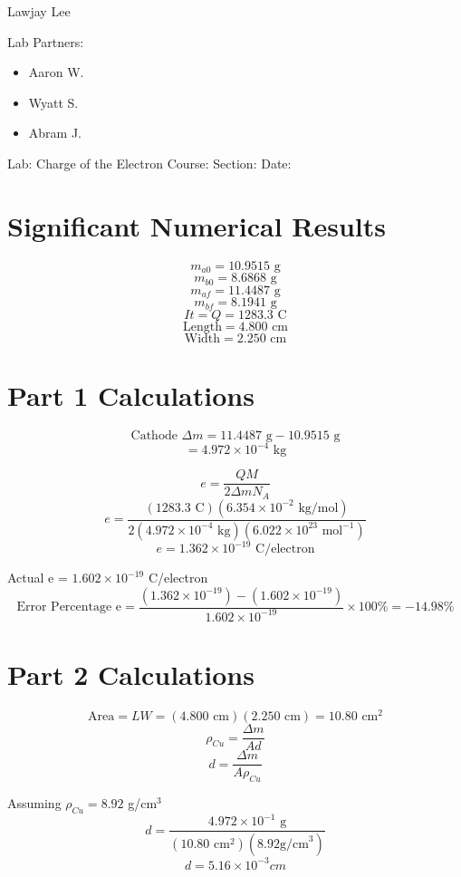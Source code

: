 \documentclass[fleqn]{article}
\begin{document}
\setlength{\mathindent}{0pt}
Lawjay Lee

Lab Partners:
\begin{itemize}
    \item Aaron W.
    \item Wyatt S.
    \item Abram J.
\end{itemize}
Lab: Charge of the Electron
Course:
Section:
Date:

\section*{Significant Numerical Results}
\[ m_{a0}=10.9515 \text{ g} \]
\[ m _{b0}=8.6868 \text{ g}  \]
\[ m _{af} =11.4487 \text{ g}  \]
\[m _{bf} = 8.1941 \text{ g}\]
\[ It = Q= 1283.3 \text{ C} \]
\[ \text{Length}=4.800 \text{ cm}\]
\[\text{Width} = 2.250 \text{ cm}\]

\section*{Part 1 Calculations}
\[ \text{Cathode } \Delta m = 11.4487 \text{ g} - 10.9515 \text{ g} \]
\[= 4.972 \times 10^{-4} \text{ kg} \]

\[ e = \frac{QM}{2 \Delta m N_A} \]
\[ e = \frac{(1283.3 \text{ C})(6.354 \times 10^{-2} \text{ kg/mol})}{2(4.972 \times 10^{-4} \text{ kg})
(6.022 \times 10^{23} \text{ mol}^{-1})
}\]
\[ e= 1.362 \times 10^{-19} \text{ C/electron}\]

Actual e = $1.602 \times 10^{-19}$ C/electron
\[ \text{Error Percentage e}=\frac{(1.362 \times 10^{-19}) - (1.602 \times 10^{-19})}{1.602 \times 10^{-19}} \times 100 \% = -14.98\%\]

\section*{Part 2 Calculations}
\[ \text{Area}=LW=(4.800 \text{ cm})(2.250 \text{ cm})=10.80 \text{ cm}^2 \]
\[ \rho _{Cu} = \frac{\Delta m}{Ad} \]
\[ d = \frac{\Delta m}{A \rho _{Cu} } \]

Assuming $\rho _{Cu}  =8.92$ g/cm$^3$
\[ d = 
\frac{4.972 \times 10^{-1} \text{ g} }
{
    (10.80 \text{ cm}^2)
    (8.92 \text{g/cm}^3)
    }
\]
\[ d=5.16 \times 10^{-3} cm \]
\end{document}
